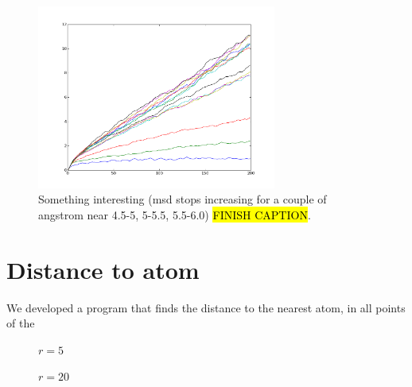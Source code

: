 \begin{figure}[htpb]%
    \centering%
    \includegraphics[width=0.7\textwidth]{images/diffusion/mean_square_displacement_interesting.png}%
    \caption{%
        Something interesting (msd stops increasing for a couple of angstrom near 4.5-5, 5-5.5, 5.5-6.0) \hl{FINISH CAPTION}. %
    }%
\end{figure}%

\FloatBarrier
\section{Distance to atom}
We developed a program that finds the distance to the nearest atom, in all points of the 
%
\setlength{\myfigwidth}{0.90\textwidth}%
\begin{figure}[htpb]%
    \centering%
    \caption{$r = 5$ \Ang}%
    \label{fig:distance_to_atom_r05}%
\end{figure}%
%
\begin{figure}[htpb]%
    \centering%
    \caption{$r = 20$ \Ang}%
    \label{fig:distance_to_atom_r20}%
\end{figure}%

\FloatBarrier
